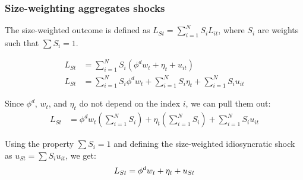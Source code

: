 \documentclass[aspectratio=169,11pt]{beamer}
\begin{document}
\begin{frame} \label{app_size_weighted}
    \frametitle{Size-weighting aggregates shocks}
    The size-weighted outcome is defined as $L_{St} = \sum_{i=1}^N S_i L_{it}$, where $S_i$ are weights such that $\sum S_i = 1$.

    \begin{align*}
        L_{St} & = \sum_{i=1}^N S_i (\phi^d w_t + \eta_t + u_{it})                                 \\
        L_{St} & = \sum_{i=1}^N S_i \phi^d w_t + \sum_{i=1}^N S_i \eta_t + \sum_{i=1}^N S_i u_{it}
    \end{align*}

    Since $\phi^d$, $w_t$, and $\eta_t$ do not depend on the index $i$, we can pull them out:
    \begin{align*}
        L_{St} & = \phi^d w_t \left( \sum_{i=1}^N S_i \right) + \eta_t \left( \sum_{i=1}^N S_i \right) + \sum_{i=1}^N S_i u_{it}
    \end{align*}

    Using the property $\sum S_i = 1$ and defining the size-weighted idiosyncratic shock as $u_{St} = \sum S_i u_{it}$, we get:
    \begin{equation}
        L_{St} = \phi^d w_t + \eta_t + u_{St} \notag
    \end{equation}
    \vspace{0.1cm}
    \hfill \hyperlink{src_equal_weighted}{}
\end{frame}
\end{document}
